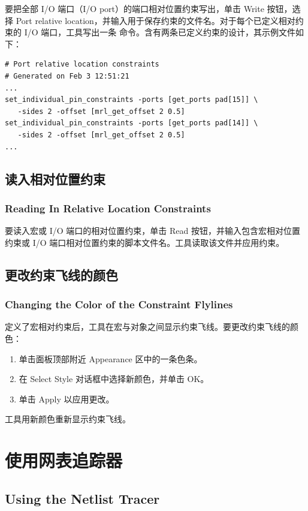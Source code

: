 要把全部 I/O 端口（I/O port）的端口相对位置约束写出，单击 Write 按钮，选择 Port relative location，并输入用于保存约束的文件名。对于每个已定义相对约束的 I/O 端口，工具写出一条  命令。含有两条已定义约束的设计，其示例文件如下：

\begin{lstlisting}
# Port relative location constraints
# Generated on Feb 3 12:51:21
...
set_individual_pin_constraints -ports [get_ports pad[15]] \
   -sides 2 -offset [mrl_get_offset 2 0.5]
set_individual_pin_constraints -ports [get_ports pad[14]] \
   -sides 2 -offset [mrl_get_offset 2 0.5]
...
\end{lstlisting}

\subsection{读入相对位置约束}
\subsubsection*{Reading In Relative Location Constraints}

要读入宏或 I/O 端口的相对位置约束，单击 Read 按钮，并输入包含宏相对位置约束或 I/O 端口相对位置约束的脚本文件名。工具读取该文件并应用约束。

\subsection{更改约束飞线的颜色}
\subsubsection*{Changing the Color of the Constraint Flylines}

定义了宏相对约束后，工具在宏与对象之间显示约束飞线。要更改约束飞线的颜色：
\begin{enumerate}
  \item 单击面板顶部附近 Appearance 区中的一条色条。
  \item 在 Select Style 对话框中选择新颜色，并单击 OK。
  \item 单击 Apply 以应用更改。
\end{enumerate}

工具用新颜色重新显示约束飞线。

\section{使用网表追踪器}
\subsection*{Using the Netlist Tracer}

